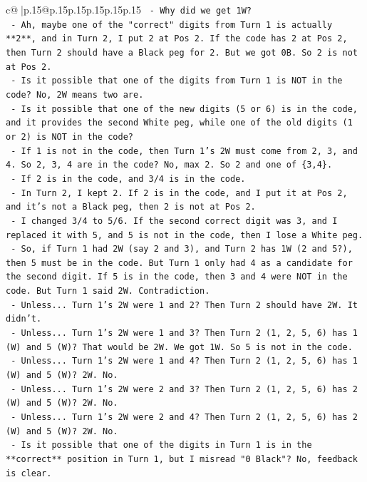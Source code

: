 \documentclass{article}
\begin{document}
{\begin{supertabular}{c@{$\;$}|p{.15\linewidth}@{}p{.15\linewidth}p{.15\linewidth}p{.15\linewidth}p{.15\linewidth}p{.15\linewidth}}
{{{\texttt{  {-} Why did we get 1W?} \\
\texttt{  {-} Ah, maybe one of the "correct" digits from Turn 1 is actually **2**, and in Turn 2, I put 2 at Pos 2. If the code has 2 at Pos 2, then Turn 2 should have a Black peg for 2. But we got 0B. So 2 is not at Pos 2.} \\
\texttt{  {-} Is it possible that one of the digits from Turn 1 is NOT in the code? No, 2W means two are.} \\
\texttt{  {-} Is it possible that one of the new digits (5 or 6) is in the code, and it provides the second White peg, while one of the old digits (1 or 2) is NOT in the code?} \\
\texttt{  {-} If 1 is not in the code, then Turn 1's 2W must come from 2, 3, and 4. So 2, 3, 4 are in the code? No, max 2. So 2 and one of \{3,4\}.} \\
\texttt{  {-} If 2 is in the code, and 3/4 is in the code.} \\
\texttt{  {-} In Turn 2, I kept 2. If 2 is in the code, and I put it at Pos 2, and it's not a Black peg, then 2 is not at Pos 2.} \\
\texttt{  {-} I changed 3/4 to 5/6. If the second correct digit was 3, and I replaced it with 5, and 5 is not in the code, then I lose a White peg.} \\
\texttt{  {-} So, if Turn 1 had 2W (say 2 and 3), and Turn 2 has 1W (2 and 5?), then 5 must be in the code. But Turn 1 only had 4 as a candidate for the second digit. If 5 is in the code, then 3 and 4 were NOT in the code. But Turn 1 said 2W. Contradiction.} \\
\texttt{  {-} Unless... Turn 1's 2W were 1 and 2? Then Turn 2 should have 2W. It didn't.} \\
\texttt{  {-} Unless... Turn 1's 2W were 1 and 3? Then Turn 2 (1, 2, 5, 6) has 1 (W) and 5 (W)? That would be 2W. We got 1W. So 5 is not in the code.} \\
\texttt{  {-} Unless... Turn 1's 2W were 1 and 4? Then Turn 2 (1, 2, 5, 6) has 1 (W) and 5 (W)? 2W. No.} \\
\texttt{  {-} Unless... Turn 1's 2W were 2 and 3? Then Turn 2 (1, 2, 5, 6) has 2 (W) and 5 (W)? 2W. No.} \\
\texttt{  {-} Unless... Turn 1's 2W were 2 and 4? Then Turn 2 (1, 2, 5, 6) has 2 (W) and 5 (W)? 2W. No.} \\
\texttt{  {-} Is it possible that one of the digits in Turn 1 is in the **correct** position in Turn 1, but I misread "0 Black"? No, feedback is clear.} \\
}}}
\end{supertabular}}
\end{document}
